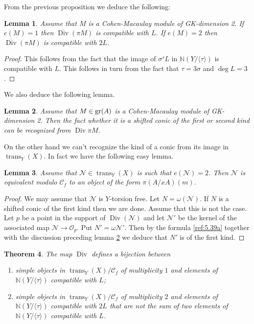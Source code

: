 \documentclass{amsproc}
\def \NN{{\mathbb N}}
\def\Cscr{{\mathcal C}}
\def\Nscr{{\mathcal N}}
\def\Oscr{{\mathcal O}}
\def\gr{\mathop{\text{gr}}}
\def\trans{\operatorname{trans}}
\def\Div{\operatorname{Div}}
\def\gr{\operatorname {gr}}
\def\gr{\operatorname {gr}}
\def\r{\rightarrow}
\let\oldtext\text
\def\text#1{\oldtext{\upshape #1}}
\newtheorem{lemmas}{Lemma}[subsection]
\newtheorem{theorems}[lemmas]{Theorem}
\theoremstyle{definition}
\theoremstyle{remark}
\numberwithin{equation}{section}
\numberwithin{table}{section}
\numberwithin{figure}{section}
\def\gr{\mathop{\text{gr}}}
\begin{document}
From the previous proposition we deduce the following:
\begin{lemmas}
\label{ref:10.2.3a}
Assume that $M$ is a Cohen-Macaulay module of GK-dimension 2. If
$e(M)=1$ then $\overline{\Div}(\pi M)$ is compatible with $L$. If $e(M)=2$ then
$\overline{\Div}(\pi M)$ is compatible with $2L$. 
\end{lemmas}
\begin{proof}
This follows from the fact that the image of $\sigma^s L$ in
$\NN(Y/\langle\tau\rangle)$ is compatible with $L$. This follows in
turn from the fact that $\tau=3\sigma$ and $\deg L=3$.
\end{proof}
We also deduce the following lemma.
\begin{lemmas}
\label{ref:10.2.4a}
Assume that $M\in\gr(A)$ is a Cohen-Macaulay module of GK-dimension 2.
Then the fact whether it is a shifted conic of the first or second
kind can be recognized from   $\Div \pi M$.
\end{lemmas}
On the other hand we can't recognize the kind of a conic from its image
in $\trans_Y(X)$. In fact we have the following easy lemma.
\begin{lemmas}
\label{ref:10.2.5a}
Assume that $\Nscr\in \trans_Y(X)$ is such that $e(\Nscr)=2$. Then
$\Nscr$ is equivalent modulo $\Cscr_f$ to an object of the form
$\pi(A/xA)(m)$.
\end{lemmas}
\begin{proof} We may assume that $\Nscr$ is $Y$-torsion free. Let
  $N=\omega(\Nscr)$. If $N$ is a shifted conic of the 
  first kind then we are done. Assume that this is not the case. Let
  $p$ be a point in the support of $\Div(\Nscr)$ and let $\Nscr'$ be
  the kernel of the associated map $\Nscr\r \Oscr_p$. Put
  $N'=\omega\Nscr'$. Then by the formula \eqref{ref:5.39a} together
  with the discussion preceding lemma \ref{ref:10.2.4a} we deduce
  that $N'$ is of the first kind.
\end{proof}
\begin{theorems}
\label{ref:10.2.6a}
 The map $\overline{\Div}$ defines a bijection between
\begin{enumerate} 
\item  simple objects in $\trans_Y(X)/\Cscr_f$ of multiplicity $1$ and
  elements of $\NN(Y/\langle \tau\rangle)$ compatible with $L$;
\item simple objects in $\trans_Y(X)/\Cscr_f$ of multiplicity $2$ and
  elements of $\NN(Y/\langle\tau\rangle)$ compatible with $2L$ that
  are not the sum of two elements of $\NN(Y/\langle\tau\rangle)$
  compatible with $L$.
\end{enumerate}
\end{theorems}
\end{document}
